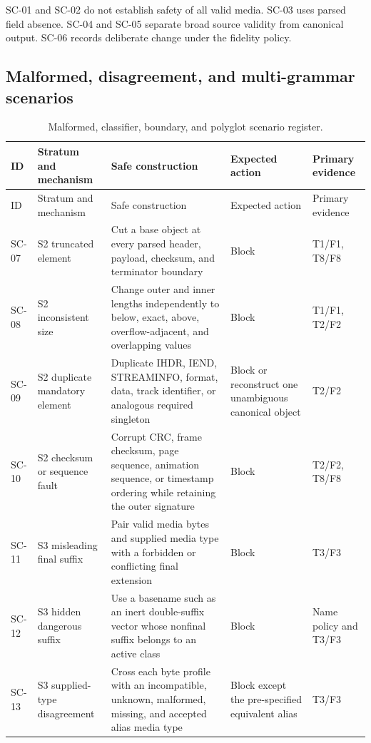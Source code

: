SC-01 and SC-02 do not establish safety of all valid media. SC-03 uses parsed
field absence. SC-04 and SC-05 separate broad source validity from canonical
output. SC-06 records deliberate change under the fidelity policy.

\subsection{Malformed, disagreement, and multi-grammar scenarios}
\label{subsec:scenario-adversarial}

\begingroup
\scriptsize
\setlength{\tabcolsep}{2.5pt}
\begin{longtable}{L{0.08\textwidth}L{0.16\textwidth}L{0.34\textwidth}L{0.11\textwidth}L{0.13\textwidth}}
\caption{Malformed, classifier, boundary, and polyglot scenario register.}
\label{tab:scenario-adversarial}\\
\toprule
ID & Stratum and mechanism & Safe construction & Expected action & Primary evidence \\
\midrule
\endfirsthead
\toprule
ID & Stratum and mechanism & Safe construction & Expected action & Primary evidence \\
\midrule
\endhead
SC-07 & S2 truncated element & Cut a base object at every parsed header, payload, checksum, and terminator boundary & Block & T1/F1, T8/F8 \\
SC-08 & S2 inconsistent size & Change outer and inner lengths independently to below, exact, above, overflow-adjacent, and overlapping values & Block & T1/F1, T2/F2 \\
SC-09 & S2 duplicate mandatory element & Duplicate IHDR, IEND, STREAMINFO, format, data, track identifier, or analogous required singleton & Block or reconstruct one unambiguous canonical object & T2/F2 \\
SC-10 & S2 checksum or sequence fault & Corrupt CRC, frame checksum, page sequence, animation sequence, or timestamp ordering while retaining the outer signature & Block & T2/F2, T8/F8 \\
SC-11 & S3 misleading final suffix & Pair valid media bytes and supplied media type with a forbidden or conflicting final extension & Block & T3/F3 \\
SC-12 & S3 hidden dangerous suffix & Use a basename such as an inert double-suffix vector whose nonfinal suffix belongs to an active class & Block & Name policy and T3/F3 \\
SC-13 & S3 supplied-type disagreement & Cross each byte profile with an incompatible, unknown, malformed, missing, and accepted alias media type & Block except the pre-specified equivalent alias & T3/F3 \\

\end{longtable}
